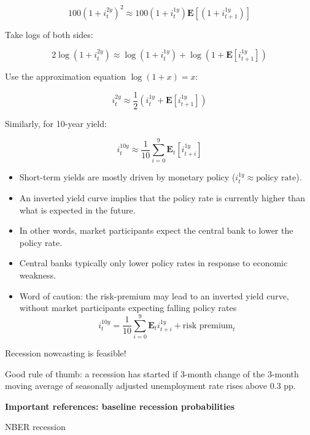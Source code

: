 \documentclass{article}
\begin{document}
\[
100(1+i_t^{2y})^2\approx 100(1+i_t^{1y})\mathbf{E}\left[(1+i_{t+1}^{1y})\right]
\]

Take logs of both sides:

\[
2\log(1+i_t^{2y})\approx\log(1+i_t^{1y})+\log\left(1+\mathbf{E}\left[i_{t+1}^{1y}\right] \right)
\]

Use the approximation equation $\log(1+x)=x$:

\[
i_t^{2y}\approx\frac{1}{2}\left(i_t^{1y}+\mathbf{E}\left[i_{t+1}^{1y}\right] \right)
\]

Similarly, for 10-year yield:

\[
i_t^{10y}\approx\frac{1}{10}\sum_{i=0}^{9}\mathbf{E}_t \left[i_{t+i}^{1y}\right]
\]

\begin{itemize}
    \item Short-term yields are mostly driven by monetary policy ($i_t^{1y}\approx\text{policy rate}$).
    \item An inverted yield curve implies that the policy rate is currently higher than what is expected in the future.
    \item In other words, market participants expect the central bank to lower the policy rate.
    \item Central banks typically only lower policy rates in response to economic weakness.
    \item Word of caution: the risk-premium may lead to an inverted yield curve, without market participants expecting falling policy rates
    \[i_t^{10y}=\frac{1}{10}\sum_{i=0}^{9}\mathbf{E}_t i_{t+i}^{1y}+\text{risk premium}_t \]
\end{itemize}

Recession nowcasting is feasible!

Good rule of thumb: a recession has started if 3-month change of the 3-month moving average of seasonally adjusted unemployment rate rises above 0.3 pp.

\textbf{Important references: baseline recession probabilities}

NBER recession
\end{document}
